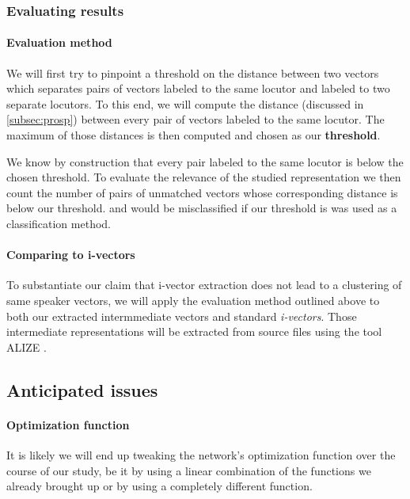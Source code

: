 \documentclass[conference]{IEEEtran}
\begin{document}
\subsubsection{Evaluating results}

\paragraph{Evaluation method}

We will first try to pinpoint a threshold on the distance
between two vectors which separates pairs of vectors labeled to the same locutor
and labeled to two separate locutors. To this end, we will compute the distance
(discussed in \ref{subsec:prosp}) between every pair of vectors labeled to the
same locutor. The maximum of those distances is then computed and chosen as our
\textbf{threshold}.

We know by construction that every pair labeled to the same locutor is below the
chosen threshold. To evaluate the relevance of the studied representation we
then count the number of pairs of unmatched vectors whose corresponding distance
is below our threshold. and would be misclassified if our threshold is was used
as a classification method.

\paragraph{Comparing to i-vectors}

 To substantiate our claim that i-vector extraction does not lead to a
 clustering of same speaker vectors, we will apply the evaluation method
 outlined above to both our
 extracted intermmediate vectors and standard \emph{i-vectors}. Those
 intermediate representations will be extracted from source files using the tool
 ALIZE \cite{larcher2013alize}.

\subsection{Anticipated issues}

\paragraph{Optimization function}

It is likely we will end up tweaking the network's optimization function over the course
of our study, be it by using a linear combination of the functions we already
brought up or by using a completely different function.
\end{document}
